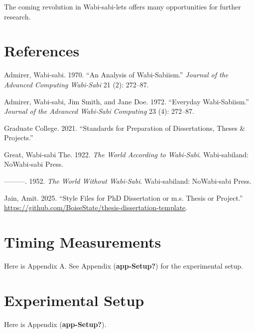 \documentclass[
  dissertation]{bsu-cs}
\newlength{\cslhangindent}
\newenvironment{CSLReferences}[2] %
 {\begin{list}{}{%
  \setlength{\itemindent}{0pt}
  \setlength{\leftmargin}{0pt}
  \setlength{\parsep}{0pt}
  \ifodd #1
   \setlength{\leftmargin}{\cslhangindent}
   \setlength{\itemindent}{-1\cslhangindent}
  \fi
  \setlength{\itemsep}{#2\baselineskip}}}
 {\end{list}}
\begin{document}
The coming revolution in Wabi-sabi-lets offers many opportunities for
further research.

\section{References}\label{references}

\label{refs}
\begin{CSLReferences}{1}{0}
Admirer, Wabi-sabi. 1970. {``An Analysis of Wabi-Sabiism.''}
\emph{Journal of the Advanced Computing Wabi-Sabi} 21 (2): 272--87.

Admirer, Wabi-sabi, Jim Smith, and Jane Doe. 1972. {``Everyday
Wabi-Sabiism.''} \emph{Journal of the Advanced Wabi-Sabi Computing} 23
(4): 272--87.

Graduate College. 2021. {``Standards for Preparation of Dissertations,
Theses \& Projects.''}

Great, Wabi-sabi The. 1922. \emph{The World According to Wabi-Sabi}.
Wabi-sabiland: NoWabi-sabi Press.

---------. 1952. \emph{The World Without Wabi-Sabi}. Wabi-sabiland:
NoWabi-sabi Press.

Jain, Amit. 2025. {``Style Files for PhD Dissertation or m.s. Thesis or
Project.''}
\url{https://github.com/BoiseState/thesis-dissertation-template}.

\end{CSLReferences}

\appendix

\section{Timing Measurements}\label{app-Timing}

Here is Appendix A. See Appendix (\textbf{app-Setup?}) for the
experimental setup.

\section{Experimental Setup}\label{app-Setup}

Here is Appendix (\textbf{app-Setup?}).

\finish

\backmatter


\end{document}
